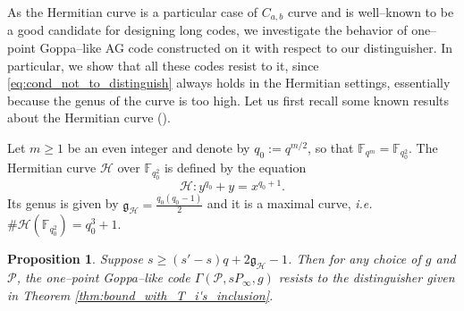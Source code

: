 \documentclass[a4paper]{amsart}
\newtheorem{proposition}[thm]{Proposition}
\theoremstyle{definition}
\theoremstyle{remark}
\newcommand{\calP}{\mathcal{P}}
\newcommand{\calH}{\mathcal{H}}
\newcommand{\fqm}{\mathbb{F}_{q^m}}
\newcommand{\fqo}{\mathbb{F}_{q_0^2}}
\begin{document}
As the Hermitian curve is a particular case of $C_{a,b}$ curve and is well--known to be a good candidate for designing long codes, we investigate the behavior of one--point Goppa--like AG code constructed on it with respect to our distinguisher.
In particular, we show that all these codes resist to it, since  \eqref{eq:cond_not_to_distinguish} always holds in the Hermitian settings, essentially because the genus of the curve is too high. Let us first recall some known results about the Hermitian curve (\cite{Sti09}). 

Let $m \geq 1$  be an even integer and denote by $q_0 := q^{m/2}$, so that $\fqm = \fqo$. The Hermitian curve $\calH$ over $\fqo$ is defined by the equation
$$\calH : y^{q_0}+y = x^{q_0+1}.$$
Its genus is given by $\mathfrak{g}_{\calH} = \frac{q_0(q_0-1)}{2}$ and it is a maximal curve, \emph{i.e.} $\#\calH(\fqo) = q_0^3+1$.

\begin{proposition} \label{prop:Hermitian_Goppa_like_are_secured}
    Suppose $s \geq (s'-s)q+2\mathfrak{g}_{\calH}-1$. Then for any choice of $g$ and $\calP$, the one--point Goppa--like code $\Gamma(\calP,sP_\infty,g)$ resists to the distinguisher given in Theorem \ref{thm:bound_with_T_i's_inclusion}.
\end{proposition}
\end{document}
